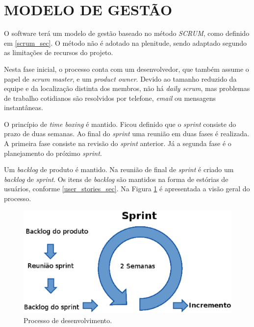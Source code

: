 \section[MODELO DE GESTÃO]{MODELO DE GESTÃO}
O software terá um modelo de gestão baseado no método \emph{SCRUM}, como definido em \ref{scrum_sec}.
O método não é adotado na plenitude, sendo adaptado segundo as limitações de recursos do projeto.

Nesta fase inicial, o processo conta com um desenvolvedor, que também assume o papel de \emph{scrum master}, e um \emph{product owner}. 
Devido ao tamanho reduzido da equipe e da localização distinta dos membros, não há \emph{daily scrum}, mas problemas de trabalho cotidianos são resolvidos por telefone, \emph{email} ou mensagens instantâneas. 

O princípio de \emph{time boxing} é mantido. Ficou definido que o \emph{sprint} consiste do prazo de duas semanas. Ao final do \emph{sprint} uma reunião em duas fases é realizada. A primeira fase consiste na revisão do \emph{sprint} anterior. Já a segunda fase é o planejamento do próximo \emph{sprint}.

Um \emph{backlog} de produto é mantido. Na reunião de final de \emph{sprint} é criado um \emph{backlog} de \emph{sprint}. 
Os itens de \emph{backlog} são mantidos na forma de estórias de usuários, conforme \ref{user_stories_sec}.
Na Figura \ref{scrum_projeto} é apresentada a visão geral do processo.

\begin{figure}[ht]
	\centering
	\includegraphics[width=15cm]{figuras/scrum_projeto.eps}
	\caption{Processo de desenvolvimento.}
	\label{scrum_projeto}
\end{figure}





